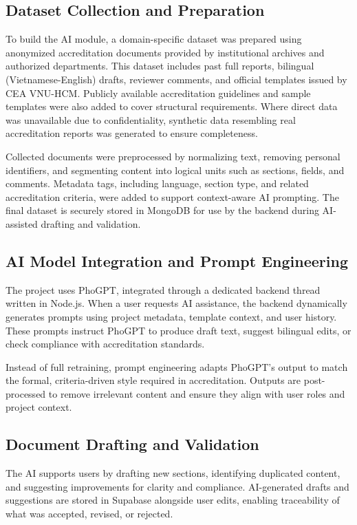 \subsection{Dataset Collection and Preparation}
To build the AI module, a domain-specific dataset was prepared using anonymized accreditation documents provided by institutional archives and authorized departments. This dataset includes past full reports, bilingual (Vietnamese-English) drafts, reviewer comments, and official templates issued by CEA VNU-HCM. Publicly available accreditation guidelines and sample templates were also added to cover structural requirements. Where direct data was unavailable due to confidentiality, synthetic data resembling real accreditation reports was generated to ensure completeness.

Collected documents were preprocessed by normalizing text, removing personal identifiers, and segmenting content into logical units such as sections, fields, and comments. Metadata tags, including language, section type, and related accreditation criteria, were added to support context-aware AI prompting. The final dataset is securely stored in MongoDB for use by the backend during AI-assisted drafting and validation.
\subsection{AI Model Integration and Prompt Engineering}
The project uses PhoGPT, integrated through a dedicated backend thread written in Node.js. When a user requests AI assistance, the backend dynamically generates prompts using project metadata, template context, and user history. These prompts instruct PhoGPT to produce draft text, suggest bilingual edits, or check compliance with accreditation standards.

Instead of full retraining, prompt engineering adapts PhoGPT’s output to match the formal, criteria-driven style required in accreditation. Outputs are post-processed to remove irrelevant content and ensure they align with user roles and project context.

\subsection{Document Drafting and Validation}
The AI supports users by drafting new sections, identifying duplicated content, and suggesting improvements for clarity and compliance. AI-generated drafts and suggestions are stored in Supabase alongside user edits, enabling traceability of what was accepted, revised, or rejected.

